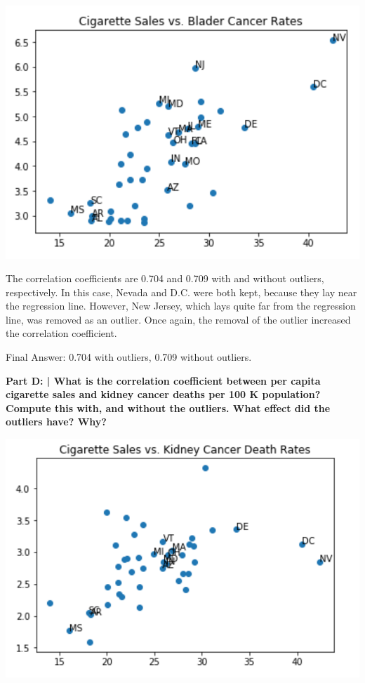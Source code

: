 \documentclass{article}
\begin{document}
 \includegraphics{HW2_2.PNG}
 
 The correlation coefficients are 0.704 and 0.709 with and without outliers, respectively. In this case, Nevada and D.C. were both kept, because they lay near the regression line. However, New Jersey, which lays quite far from the regression line, was removed as an outlier. Once again, the removal of the outlier increased the correlation coefficient.\newline
 
 Final Answer: 0.704 with outliers, 0.709 without outliers.\newline
 
 \textbf{Part D: | What is the correlation coefficient between per capita cigarette sales and kidney cancer deaths per 100 K population? Compute this with, and without the outliers. What effect did the outliers have? Why?}\newline
  
 \includegraphics{HW2_3.PNG}
\end{document}
